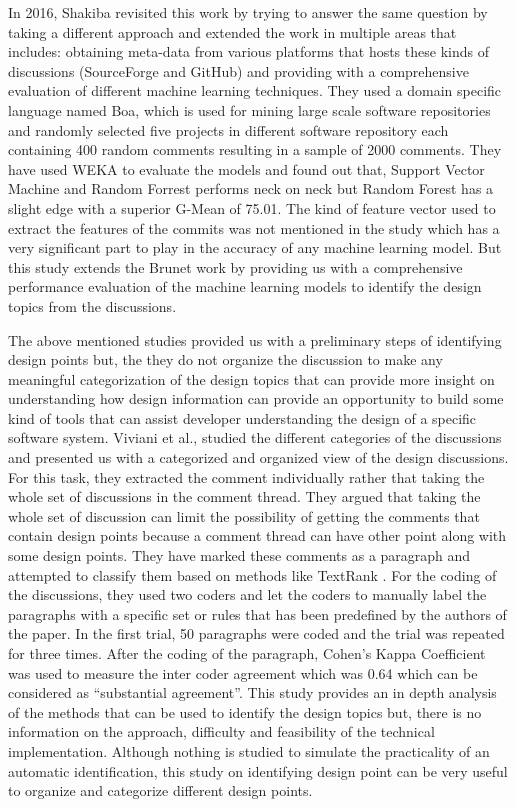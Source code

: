 In 2016, Shakiba \cite{Shakiba2016} revisited this work by trying to answer the same question by taking a different approach and extended the work in multiple areas that includes: obtaining meta-data from various platforms that hosts these kinds of discussions (SourceForge and GitHub) and providing with a comprehensive evaluation of different machine learning techniques. They used a domain specific language named Boa, which is used for mining large scale software repositories and randomly selected five projects in different software repository each containing 400 random comments resulting in a sample of 2000 comments. They have used WEKA to evaluate the models and found out that, Support Vector Machine and Random Forrest performs neck on neck but Random Forest has a slight edge with a superior G-Mean of 75.01. The kind of feature vector used to extract the features of the commits was not mentioned in the study which has a very significant part to play in the accuracy of any machine learning model. But this study extends the Brunet work by providing us with a comprehensive performance evaluation of the machine learning models to identify the design topics from the discussions.

The above mentioned studies provided us with a preliminary steps of identifying design points but, the they do not organize the discussion to make any meaningful categorization of the design topics that can provide more insight on understanding how design information can provide an opportunity to build some kind of tools that can assist developer understanding the design of a specific software system. Viviani et al.,\cite{Viviani2018} studied the different categories of the discussions and presented us with a categorized and organized view of the design discussions. For this task, they extracted the comment individually rather that taking the whole set of discussions in the comment thread. They argued that taking the whole set of discussion can limit the possibility of getting the comments that contain design points because a comment thread can have other point along with some design points. They have marked these comments as a paragraph and attempted to classify them based on methods like TextRank \cite{Mihalcea2004}. For the coding of the discussions, they used two coders and let the coders to manually label the paragraphs with a specific set or rules that has been predefined by the authors of the paper. In the first trial, 50 paragraphs were coded and the trial was repeated for three times. After the coding of the paragraph, Cohen's Kappa Coefficient was used to measure the inter coder agreement which was 0.64 which can be considered as ``substantial agreement''. This study provides an in depth analysis of the methods that can be used to identify the design topics but, there is no information on the approach, difficulty and feasibility of the technical implementation. Although nothing is studied to simulate the practicality of an automatic identification, this study on identifying design point can be very useful to organize and categorize different design points.

